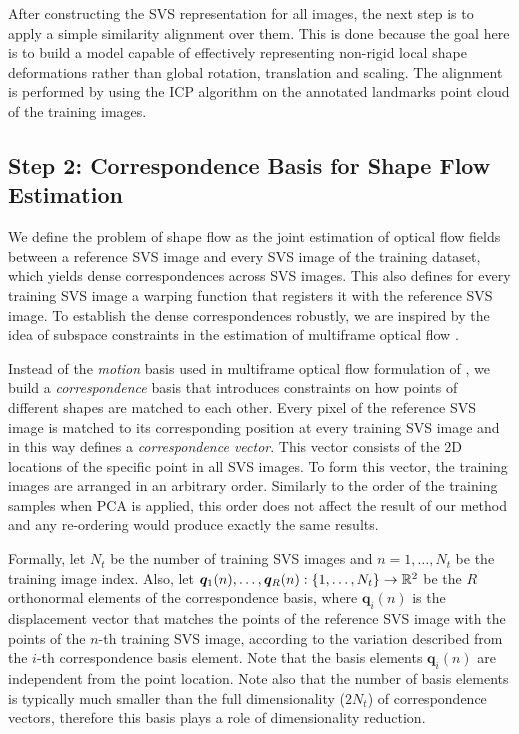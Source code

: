 After constructing the SVS representation for all images, the next step is to apply a simple similarity alignment over them. This is done because the goal here is to build a model capable of effectively representing non-rigid local shape deformations rather than global rotation, translation and scaling. The alignment is performed by using the ICP algorithm \cite{Besl1992} on the annotated landmarks point cloud of the training images.


\vspace{0.2cm}
{\label{sec:step2}\subsection*{Step 2: Correspondence Basis for Shape Flow Estimation}}

We define the problem of shape flow as the joint estimation of optical flow fields between a reference SVS image and every SVS image of the training dataset, which yields dense correspondences across SVS images. This also defines for every training SVS image a warping function that registers it with the reference SVS image. To establish the dense correspondences robustly, we are inspired by the idea of subspace constraints in the estimation of multiframe optical flow \cite{Garg:2013hu,tomasi2012dense,snape15faceflow}.

Instead of the \emph{motion} basis used in multiframe optical flow formulation of \cite{Garg:2013hu}, we build a \emph{correspondence} basis that introduces constraints on how points of different shapes are matched to each other. Every pixel of the reference SVS image is matched to its corresponding position at every training SVS image and in this way defines a \emph{correspondence vector}. This vector consists of the 2D locations of the specific point in all SVS images. To form this vector, the training images are arranged in an arbitrary order. Similarly to the order of the training samples when PCA is applied, this order does not affect the result of our method and any re-ordering would produce exactly the same results.


Formally, let $N_t$ be the number of training SVS images and $n=1,\ldots,N_t$ be the training image index. Also, let $\boldsymbol{q}_1(n),\ldots,\boldsymbol{q}_R(n):\{1,\ldots,N_t\} \rightarrow \mathbb{R}^2$ be the $R$ orthonormal elements of the correspondence basis, where $\boldsymbol{q}_i(n)$ is the displacement vector that matches the points of the reference SVS image with the points of the $n$-th training SVS image, according to the variation described from the $i$-th correspondence basis element. Note that the basis elements $\boldsymbol{q}_i(n)$ are independent from the point location. Note also that the number of basis elements is typically much smaller than the full dimensionality ($2 N_t$) of correspondence vectors, therefore this basis plays a role of dimensionality reduction. 


